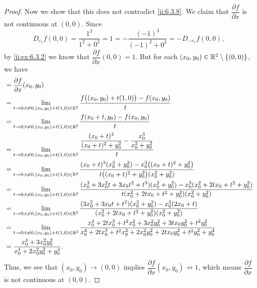 \begin{proof}
  Now we show that this does not contradict \cref{ii:6.3.8}.
  We claim that \(\dfrac{\partial f}{\partial x}\) is not continuous at \((0, 0)\).
  Since
  \[
    D_{e_1} f(0, 0) = \dfrac{1^3}{1^2 + 0^2} = 1 = -\dfrac{(-1)^3}{(-1)^2 + 0^2} = -D_{-e_1} f(0, 0),
  \]
  by \cref{ii:ex:6.3.2} we know that \(\dfrac{\partial f}{\partial x}(0, 0) = 1\).
  But for each \((x_0, y_0) \in \mathbb{R}^2 \setminus \left\lbrace(0, 0)\right\rbrace\), we have
  \begin{align*}
     & = \dfrac{\partial f}{\partial x}(x_0, y_0)                                                                                                                                                                                      \\
     & = \lim_{t \to 0 ; t \neq 0, (x_0, y_0) + t(1, 0) \in \mathbb{R}^2} \dfrac{f\big((x_0, y_0) + t(1, 0)\big) - f(x_0, y_0)}{t}                                                                                                             \\
     & = \lim_{t \to 0 ; t \neq 0, (x_0, y_0) + t(1, 0) \in \mathbb{R}^2} \dfrac{f(x_0 + t, y_0) - f(x_0, y_0)}{t}                                                                                                                             \\
     & = \lim_{t \to 0 ; t \neq 0, (x_0, y_0) + t(1, 0) \in \mathbb{R}^2} \dfrac{\dfrac{(x_0 + t)^3}{(x_0 + t)^2 + y_0^2} - \dfrac{x_0^3}{x_0^2 + y_0^2}}{t}                                                                                   \\
     & = \lim_{t \to 0 ; t \neq 0, (x_0, y_0) + t(1, 0) \in \mathbb{R}^2} \dfrac{(x_0 + t)^3 (x_0^2 + y_0^2) - x_0^3 \big((x_0 + t)^2 + y_0^2\big)}{t \big((x_0 + t)^2 + y_0^2\big) (x_0^2 + y_0^2)}                                           \\
     & = \lim_{t \to 0 ; t \neq 0, (x_0, y_0) + t(1, 0) \in \mathbb{R}^2} \dfrac{(x_0^3 + 3 x_0^2 t + 3 x_0 t^2 + t^3) (x_0^2 + y_0^2) - x_0^3 (x_0^2 + 2 t x_0 + t^2 + y_0^2)}{t (x_0^2 + 2 t x_0 + t^2 + y_0^2) (x_0^2 + y_0^2)}             \\
     & = \lim_{t \to 0 ; t \neq 0, (x_0, y_0) + t(1, 0) \in \mathbb{R}^2} \dfrac{(3 x_0^2 + 3 x_0 t + t^2) (x_0^2 + y_0^2) - x_0^3 (2 x_0 + t)}{(x_0^2 + 2 t x_0 + t^2 + y_0^2) (x_0^2 + y_0^2)}                                               \\
     & = \lim_{t \to 0 ; t \neq 0, (x_0, y_0) + t(1, 0) \in \mathbb{R}^2} \dfrac{x_0^4 + 2 t x_0^3 + t^2 x_0^2 + 3 x_0^2 y_0^2 + 3 t x_0 y_0^2 + t^2 y_0^2}{x_0^4 + 2 t x_0^3 + t^2 x_0^2 + 2 x_0^2 y_0^2 + 2 t x_0 y_0^2 + t^2 y_0^2 + y_0^4} \\
     & = \dfrac{x_0^4 + 3 x_0^2 y_0^2}{x_0^4 + 2 x_0^2 y_0^2 + y_0^4}.
  \end{align*}
  Thus, we see that \((x_0, y_0) \to (0, 0)\) implies \(\dfrac{\partial f}{\partial x}(x_0, y_0) \not\to 1\), which means \(\dfrac{\partial f}{\partial x}\) is not continuous at \((0, 0)\).
\end{proof}


